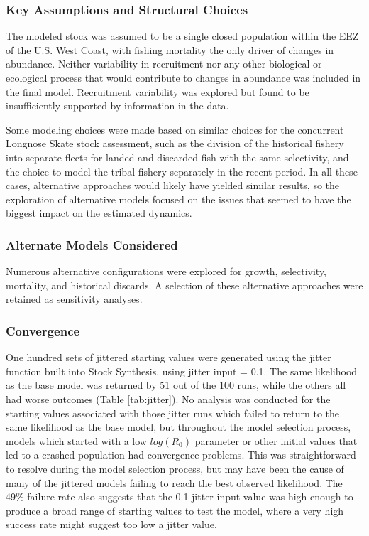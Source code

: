 \documentclass[12pt,]{article}
\begin{document}
\hypertarget{key-assumptions-and-structural-choices}{%
\subsubsection{Key Assumptions and Structural
Choices}\label{key-assumptions-and-structural-choices}}

The modeled stock was assumed to be a single closed population within
the EEZ of the U.S. West Coast, with fishing mortality the only driver
of changes in abundance. Neither variability in recruitment nor any
other biological or ecological process that would contribute to changes
in abundance was included in the final model. Recruitment variability
was explored but found to be insufficiently supported by information in
the data.

Some modeling choices were made based on similar choices for the
concurrent Longnose Skate stock assessment, such as the division of the
historical fishery into separate fleets for landed and discarded fish
with the same selectivity, and the choice to model the tribal fishery
separately in the recent period. In all these cases, alternative
approaches would likely have yielded similar results, so the exploration
of alternative models focused on the issues that seemed to have the
biggest impact on the estimated dynamics.

\hypertarget{alternate-models-considered}{%
\subsubsection{Alternate Models
Considered}\label{alternate-models-considered}}

Numerous alternative configurations were explored for growth,
selectivity, mortality, and historical discards. A selection of these
alternative approaches were retained as sensitivity analyses.

\hypertarget{convergence}{%
\subsubsection{Convergence}\label{convergence}}

One hundred sets of jittered starting values were generated using the
jitter function built into Stock Synthesis, using jitter input = 0.1.
The same likelihood as the base model was returned by 51 out of the 100
runs, while the others all had worse outcomes (Table \ref{tab:jitter}).
No analysis was conducted for the starting values associated with those
jitter runs which failed to return to the same likelihood as the base
model, but throughout the model selection process, models which started
with a low \(log(R_0)\) parameter or other initial values that led to a
crashed population had convergence problems. This was straightforward to
resolve during the model selection process, but may have been the cause
of many of the jittered models failing to reach the best observed
likelihood. The 49\% failure rate also suggests that the 0.1 jitter
input value was high enough to produce a broad range of starting values
to test the model, where a very high success rate might suggest too low
a jitter value.
\end{document}
